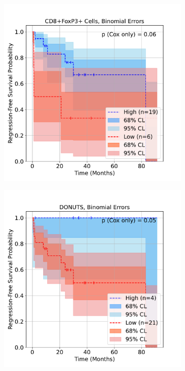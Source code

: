 \documentclass[article]{jss}
\begin{document}
\begin{figure}[p]
\begin{subfigure}[t]{\figwidth}
    \caption{\label{fig:lung-dataset-donuts-patient-wise}}
  \end{subfigure} \\
  \vspace{\spacebetweenrows}
  \begin{subfigure}[t]{\figwidth}
    \centering
    \includegraphics[width=\linewidth]{lung_cells_km_RFS_binomial.pdf}
    \caption{\label{fig:lung-dataset-cells-binomial}}
  \end{subfigure}
  \begin{subfigure}[t]{\figwidth}
    \centering
    \includegraphics[width=\linewidth]{lung_donuts_km_RFS_binomial.pdf}

\end{subfigure}
\end{figure}
\end{document}
